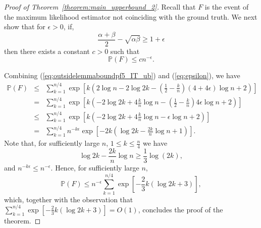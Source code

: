 \documentclass[english]{article}
\newtheorem{lemma}{Lemma}
\newcommand{\1}{\textbf{1}}
\newcommand{\p}{\mathbb{P}}
\begin{document}
\begin{proof}[Proof of Theorem~\ref{theorem:main_upperbound_2}]
Recall that $F$ is the event of the maximum likelihood estimator not coinciding with the ground truth. We next show that for $\epsilon>0$, if,
\begin{equation}\label{eq:epsilon}
\frac{\alpha+\beta}{2} -\sqrt{\alpha \beta} \geq 1+\epsilon
\end{equation}
then there exists a constant $c>0$ such that
\begin{equation}\label{eq:with14epsilon_14}
\p(F) \leq cn^{-\epsilon}.
\end{equation}

Combining (\ref{eq:outsidelemmaboundpf5_IT_ub}) and (\ref{eq:epsilon}), we have
\begin{eqnarray}
\p(F) & \leq &  \sum_{k=1}^{n/4}  \exp\left[k\left( 2 \log n - 2\log 2k - \left(\frac{1}2-\frac{k}n\right) \left( 4+4\epsilon \right) \log n +2\right)\right]\nonumber\\
& = &  \sum_{k=1}^{n/4}  \exp\left[k\left(  - 2\log 2k +  4\frac{k}n\log n - \left(\frac{1}2-\frac{k}n\right) 4\epsilon \log n+2 \right)\right]\nonumber\\
& \leq &  \sum_{k=1}^{n/4}  \exp\left[k\left(  - 2\log 2k +  4\frac{k}n\log n - \epsilon \log n+2 \right)\right]\\
& = &  \sum_{k=1}^{n/4} n^{-k\epsilon} \exp\left[-2k\left( \log 2k -  \frac{2k}n\log n +1 \right)\right].\nonumber
\end{eqnarray}
Note that, for sufficiently large $n$, $1\leq k\leq \frac{n}4$ we have
\[
\log 2k -  \frac{2k}n\log n \geq \frac13 \log(2k),
\]
and $ n^{-k\epsilon} \leq n^{-\epsilon}$.
Hence, for sufficiently large $n$,
\[
\p(F) \leq n^{-\epsilon}\sum_{k=1}^{n/4} \exp\left[-\frac23k\left(\log 2k + 3\right)\right],
\]
which, together with the observation that $\sum_{k=1}^{n/4} \exp\left[-\frac23k\left(\log 2k + 3\right)\right] = O(1)$, concludes the proof of the theorem.
\end{proof}
\end{document}
